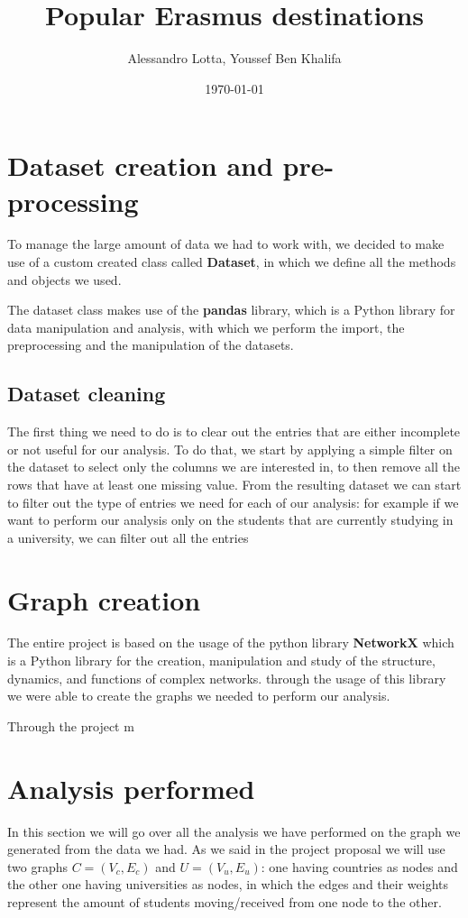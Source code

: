 
\usepackage{hyperref}
\usepackage{xurl}
\usepackage{listings}
\usepackage{subcaption}
\title{Popular Erasmus destinations}
\author{Alessandro Lotta, Youssef Ben Khalifa}
\date{\today}

\maketitle \tableofcontents 
\newpage

\section{Dataset creation and pre-processing}
To manage the large amount of data we had to work with, we decided to make use of a custom created class called \textbf{Dataset}, in which we define all the 
methods and objects we used. 

The dataset class makes use of the \textbf{pandas} library, which is a Python library for data manipulation and analysis, with which 
we perform the import, the preprocessing and the manipulation of the datasets. 

\subsection*{Dataset cleaning}
The first thing we need to do is to clear out the entries that are either incomplete or not useful for our analysis. To do that, 
we start by applying a simple filter on the dataset to select only the columns we are interested in, to then remove all 
the rows that have at least one missing value. 
From the resulting dataset we can start to filter out the type of entries we need for each of our analysis: for example if we 
want to perform our analysis only on the students that are currently studying in a university, we can filter out all the entries
\section{Graph creation}
The entire project is based on the usage of the python library \textbf{NetworkX} which is a Python library for the creation, manipulation and study of the structure, dynamics, and functions of complex networks.
through the usage of this library we were able to create the graphs we needed to perform our analysis.

Through the project m
\section{Analysis performed}
    In this section we will go over all the analysis we have performed on the graph we generated from the data we had.
    As we said in the project proposal we will use two graphs $C = (V_c, E_c)$ and $U = (V_u, E_u)$: 
    one having countries as nodes and the other one having universities as nodes, 
    in which the edges and their weights represent the amount of students moving/received from one node to the other.

